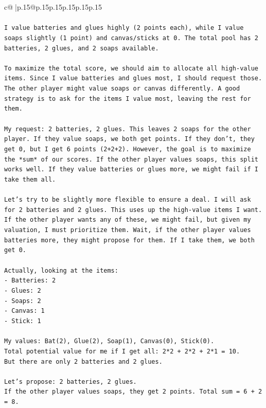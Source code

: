 \documentclass{article}
\begin{document}
{\begin{supertabular}{c@{$\;$}|p{.15\linewidth}@{}p{.15\linewidth}p{.15\linewidth}p{.15\linewidth}p{.15\linewidth}p{.15\linewidth}}
{{{\\ 
\\ 
\texttt{I value batteries and glues highly (2 points each), while I value soaps slightly (1 point) and canvas/sticks at 0. The total pool has 2 batteries, 2 glues, and 2 soaps available.} \\
\\ 
\texttt{To maximize the total score, we should aim to allocate all high{-}value items. Since I value batteries and glues most, I should request those. The other player might value soaps or canvas differently. A good strategy is to ask for the items I value most, leaving the rest for them.} \\
\\ 
\texttt{My request: 2 batteries, 2 glues. This leaves 2 soaps for the other player. If they value soaps, we both get points. If they don't, they get 0, but I get 6 points (2+2+2). However, the goal is to maximize the *sum* of our scores. If the other player values soaps, this split works well. If they value batteries or glues more, we might fail if I take them all.} \\
\\ 
\texttt{Let's try to be slightly more flexible to ensure a deal. I will ask for 2 batteries and 2 glues. This uses up the high{-}value items I want. If the other player wants any of these, we might fail, but given my valuation, I must prioritize them. Wait, if the other player values batteries more, they might propose for them. If I take them, we both get 0.} \\
\\ 
\texttt{Actually, looking at the items:} \\
\texttt{{-} Batteries: 2} \\
\texttt{{-} Glues: 2} \\
\texttt{{-} Soaps: 2} \\
\texttt{{-} Canvas: 1} \\
\texttt{{-} Stick: 1} \\
\\ 
\texttt{My values: Bat(2), Glue(2), Soap(1), Canvas(0), Stick(0).} \\
\texttt{Total potential value for me if I get all: 2*2 + 2*2 + 2*1 = 10.} \\
\texttt{But there are only 2 batteries and 2 glues.} \\
\\ 
\texttt{Let's propose: 2 batteries, 2 glues.} \\
\texttt{If the other player values soaps, they get 2 points. Total sum = 6 + 2 = 8.} \\
}}}
\end{supertabular}}
\end{document}
